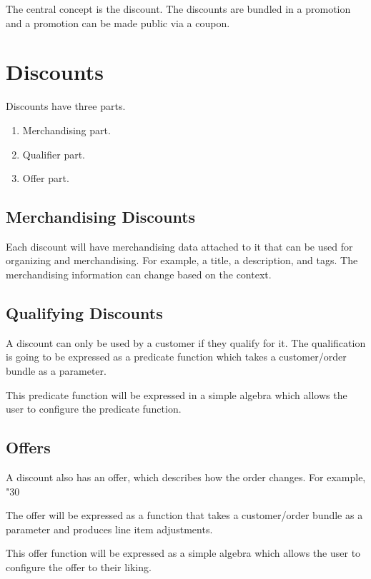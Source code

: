 \documentclass[11pt]{article}
\begin{document}
The central concept is the discount. The discounts are bundled in a promotion
and a promotion can be made public via a coupon.

\section{Discounts}

Discounts have three parts.

\begin{enumerate}
    \item Merchandising part.
    \item Qualifier part.
    \item Offer part.
\end{enumerate}

\subsection{Merchandising Discounts}

Each discount will have merchandising data attached to it that can be used for organizing
and merchandising. For example, a title, a description, and tags. The merchandising
information can change based on the context. 

\subsection{Qualifying Discounts}

A discount can only be used by a customer if they qualify for it. The qualification
is going to be expressed as a predicate function which takes a customer/order
bundle as a parameter.

This predicate function will be expressed in a simple algebra which allows
the user to configure the predicate function.

\subsection{Offers}

A discount also has an offer, which describes how the order changes. For example,
"30%

The offer will be expressed as a function that takes a customer/order bundle as a
parameter and produces line item adjustments.

This offer function will be expressed as a simple algebra which allows the user
to configure the offer to their liking.
\end{document}

